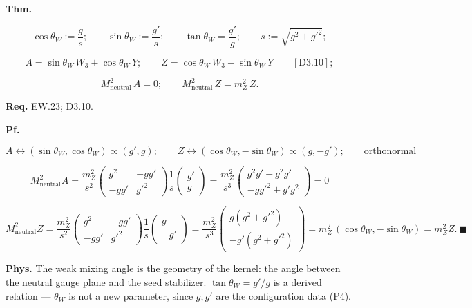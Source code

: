 \begin{theorem}\label{tag:EW-24}
\textbf{Thm.}

\[
\cos\theta_W:=\frac{g}{s};\qquad\sin\theta_W:=\frac{g'}{s};\qquad\tan\theta_W=\frac{g'}{g};\qquad s:=\sqrt{g^2+g'^2};
\]

\[
A=\sin\theta_W\,W_3+\cos\theta_W\,Y;\qquad
Z=\cos\theta_W\,W_3-\sin\theta_W\,Y\qquad[\mathrm{D3.10}];
\]

\[
M^2_{\mathrm{neutral}}\,A=0;\qquad M^2_{\mathrm{neutral}}\,Z=m_Z^2\,Z .
\]

\textbf{Req.} EW.23; D3.10.

\textbf{Pf.}

\[
A\leftrightarrow(\sin\theta_W,\cos\theta_W)\propto(g',g);\qquad Z\leftrightarrow(\cos\theta_W,-\sin\theta_W)\propto(g,-g');\qquad\text{orthonormal}
\]

\[
M^2_{\mathrm{neutral}}A=\frac{m_Z^2}{s^2}\begin{pmatrix}g^2&-gg'\\ -gg'&g'^2\end{pmatrix}\frac1s\begin{pmatrix}g'\\ g\end{pmatrix}
=\frac{m_Z^2}{s^3}\begin{pmatrix}g^2g'-g^2g'\\ -gg'^2+g'g^2\end{pmatrix}=0
\]

\[
M^2_{\mathrm{neutral}}Z=\frac{m_Z^2}{s^2}\begin{pmatrix}g^2&-gg'\\ -gg'&g'^2\end{pmatrix}\frac1s\begin{pmatrix}g\\ -g'\end{pmatrix}
=\frac{m_Z^2}{s^3}\begin{pmatrix}g(g^2+g'^2)\\ -g'(g^2+g'^2)\end{pmatrix}=m_Z^2\,(\cos\theta_W,-\sin\theta_W)=m_Z^2Z.\ \blacksquare
\]

\textbf{Phys.} The weak mixing angle is the geometry of the kernel: the angle between the neutral gauge plane and the seed stabilizer. $\tan\theta_W=g'/g$ is a derived relation — $\theta_W$ is not a new parameter, since $g,g'$ are the configuration data (P4).

\end{theorem}

